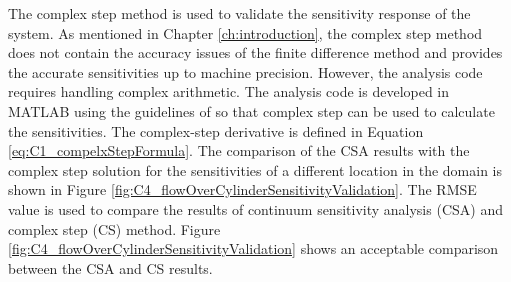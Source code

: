 The complex step method is used to validate the sensitivity response of the system. As mentioned in Chapter \ref{ch:introduction}, the complex step method does not contain the accuracy issues of the finite difference method and provides the accurate sensitivities up to machine precision. However, the analysis code requires handling complex arithmetic. The analysis code is developed in MATLAB using the guidelines of \cite{martins2003complex} so that complex step can be used to calculate the sensitivities. The complex-step derivative is defined in Equation \eqref{eq:C1_compelxStepFormula}. The comparison of the CSA results with the complex step solution for the sensitivities of a different location in the domain is shown in Figure \ref{fig:C4_flowOverCylinderSensitivityValidation}. The RMSE value is used to compare the results of continuum sensitivity analysis (CSA) and complex step (CS) method. Figure \ref{fig:C4_flowOverCylinderSensitivityValidation} shows an acceptable comparison between the CSA and CS results.

